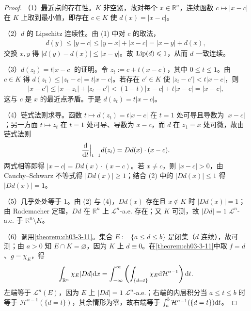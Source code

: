 \documentclass[../../main.tex]{subfiles}%
\begin{document}
\begin{proof}
（1）最近点的存在性。$K$ 非空紧，故对每个 $x\in\mathbb{R}^n$，连续函数 $c\mapsto\lvert x-c\rvert$ 在 $K$ 上取到最小值，即存在 $c\in K$ 使 $d(x)=\lvert x-c\rvert$。

（2）$d$ 的 Lipschitz 连续性。由 (1) 中对 $c$ 的取法，
\begin{align*}
d(y)\leqslant\lvert y-c\rvert\leqslant\lvert y-x\rvert+\lvert x-c\rvert=\lvert x-y\rvert+d(x),
\end{align*}
交换 $x,y$ 得 $\lvert d(y)-d(x)\rvert\leqslant\lvert x-y\rvert$。故 $\operatorname{Lip}(d)\leqslant1$，从而 $d$ 一致连续。

（3）$d(z_t)=t\lvert x-c\rvert$ 的证明。令 $z_t:=c+t(x-c)$，其中 $0\leqslant t\leqslant1$。由 $c\in K$ 得 $d(z_t)\leqslant\lvert z_t-c\rvert=t\lvert x-c\rvert$。若存在 $c'\in K$ 使 $\lvert z_t-c'\rvert<t\lvert x-c\rvert$，则
\begin{align*}
\lvert x-c'\rvert\leqslant\lvert x-z_t\rvert+\lvert z_t-c'\rvert<(1-t)\lvert x-c\rvert+t\lvert x-c\rvert=\lvert x-c\rvert,
\end{align*}
这与 $c$ 是 $x$ 的最近点矛盾。于是 $d(z_t)=t\lvert x-c\rvert$。

（4）链式法则求导。函数 $t\mapsto d(z_t)=t\lvert x-c\rvert$ 在 $t=1$ 处可导且导数为 $\lvert x-c\rvert$；另一方面 $t\mapsto z_t$ 在 $t=1$ 处可导、导数为 $x-c$，而 $d$ 在 $z_1=x$ 处可微，故由链式法则
\begin{align*}
\frac{\mathrm{d}}{\mathrm{d} t}\Big|_{t=1}d(z_t)=Dd(x)\cdot(x-c).
\end{align*}
两式相等即得 $\lvert x-c\rvert=Dd(x)\cdot(x-c)$。若 $x\neq c$，则 $\lvert x-c\rvert>0$，由 Cauchy--Schwarz 不等式得 $\lvert Dd(x)\rvert\geqslant1$；结合 (2) 中的 $\lvert Dd(x)\rvert\leqslant1$ 得 $\lvert Dd(x)\rvert=1$。

（5）几乎处处等于 $1$。由 (2) 与 (4)，$Dd(x)$ 存在且 $x\notin K$ 时 $\lvert Dd(x)\rvert=1$；由 Rademacher 定理，$Dd$ 在 $\mathbb{R}^n$ 上 $\mathcal{L}^n$-a.e. 存在；又 $K$ 可测，故 $\lvert Dd\rvert=1$ $\mathcal{L}^n$-a.e. 于 $\mathbb{R}^n\setminus K$。

（6）调用\cref{theorem:ch03-3-11}。集合 $E:=\{a\leqslant d\leqslant b\}$ 是闭集（$d$ 连续），故可测；由 $a>0$ 知 $E\cap K=\varnothing$，因为 $K$ 上 $d\equiv0$。在\cref{theorem:ch03-3-11}中取 $f=d$、$g=\chi_E$，得%
\begin{align*}
\int_{\mathbb{R}^n}\chi_E\lvert Dd\rvert\mathrm{d} x=\int_{-\infty}^{\infty}\left(\int_{\{d=t\}}\chi_E\mathrm{d}\mathcal{H}^{n-1}\right)\mathrm{d} t.
\end{align*}
左端等于 $\mathcal{L}^n(E)$，因为 $E$ 上 $\lvert Dd\rvert=1$ $\mathcal{L}^n$-a.e.；右端的内层积分当 $a\leqslant t\leqslant b$ 时等于 $\mathcal{H}^{n-1}(\{d=t\})$，其余情形为零，故右端等于 $\int_a^b\mathcal{H}^{n-1}(\{d=t\})\mathrm{d} t$。
\end{proof}
\end{document}
